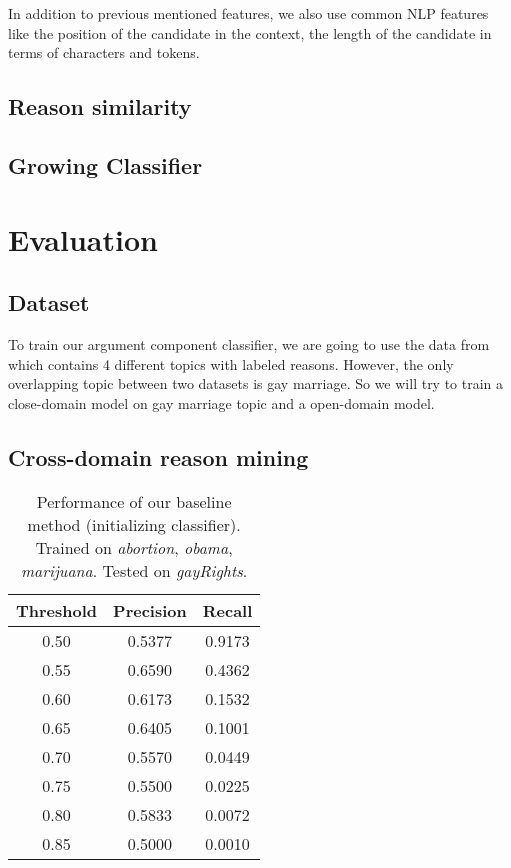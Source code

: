 \documentclass[11pt,a4paper]{article}
\begin{document}
In addition to previous mentioned features, we also use common NLP features like the position of the candidate in the context, the length of the candidate in terms of characters and tokens.





\subsection{Reason similarity}


\subsection{Growing Classifier}



\section{Evaluation}
\label{sec:evaluation}


\subsection{Dataset}

To train our argument component classifier, we are going to use the data from \cite{hasan2014you} which contains 4 different topics with labeled reasons. However, the only overlapping topic between two datasets is gay marriage. So we will try to train a close-domain model on gay marriage topic and a open-domain model. 



\subsection{Cross-domain reason mining}

\begin{table}[h]
\begin{center}
\begin{tabular}{|c||c|c|}
\hline \bf Threshold & \bf Precision & \bf Recall \\ \hline\hline
0.50& 0.5377    & 0.9173 \\
0.55& 0.6590    & 0.4362 \\
0.60& 0.6173    & 0.1532 \\
0.65& 0.6405    & 0.1001 \\
0.70& 0.5570    & 0.0449 \\
0.75& 0.5500    & 0.0225 \\
0.80& 0.5833    & 0.0072 \\
0.85& 0.5000    & 0.0010 \\ 
\hline
\end{tabular}
\end{center}
\caption{\label{tab:ic} Performance of our baseline method (initializing classifier). Trained on {\it abortion}, {\it obama}, {\it marijuana}. Tested on {\it gayRights}.}
\end{table}
\end{document}
